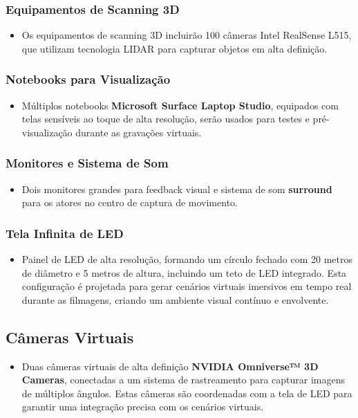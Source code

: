 \subsubsection{Equipamentos de Scanning 3D}
\begin{itemize}
    \item Os equipamentos de scanning 3D incluirão 100 câmeras Intel RealSense L515, que utilizam tecnologia LIDAR para capturar objetos em alta definição.
\end{itemize}

\subsubsection{Notebooks para Visualização}
\begin{itemize}
    \item Múltiplos notebooks \textbf{Microsoft Surface Laptop Studio}, equipados com telas sensíveis ao toque de alta resolução, serão usados para testes e pré-visualização durante as gravações virtuais.
\end{itemize}

\subsubsection{Monitores e Sistema de Som}
\begin{itemize}
    \item Dois monitores grandes para feedback visual e sistema de som \textbf{surround} para os atores no centro de captura de movimento.
\end{itemize}

\subsubsection{Tela Infinita de LED}
\begin{itemize}
    \item Painel de LED de alta resolução, formando um círculo fechado com 20 metros de diâmetro e 5 metros de altura, incluindo um teto de LED integrado. Esta configuração é projetada para gerar cenários virtuais imersivos em tempo real durante as filmagens, criando um ambiente visual contínuo e envolvente.
\end{itemize}

\subsection{Câmeras Virtuais}
\begin{itemize}
    \item Duas câmeras virtuais de alta definição \textbf{NVIDIA Omniverse™ 3D Cameras}, conectadas a um sistema de rastreamento para capturar imagens de múltiplos ângulos. Estas câmeras são coordenadas com a tela de LED para garantir uma integração precisa com os cenários virtuais.
\end{itemize}

